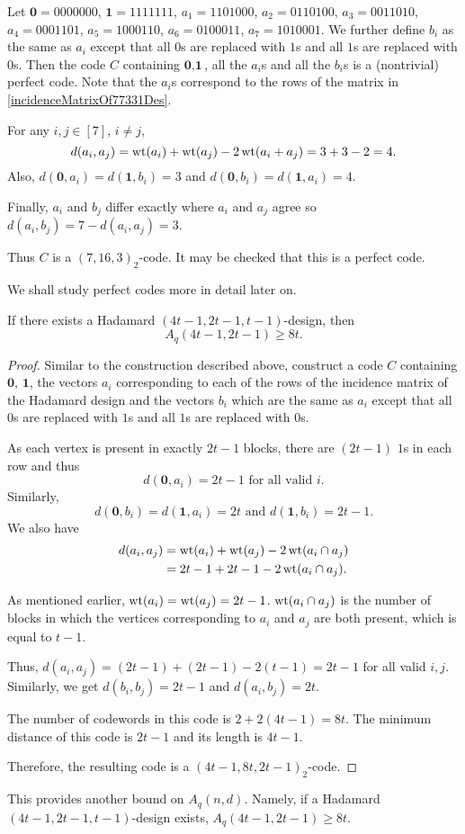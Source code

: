 Let $\textbf{0}=0000000$, $\textbf{1}=1111111$, $a_1=1101000$, $a_2=0110100$, $a_3=0011010$, $a_4=0001101$, $a_5=1000110$, $a_6=0100011$, $a_7=1010001$. We further define $b_i$ as the same as $a_i$ except that all $0$s are replaced with $1$s and all $1$s are replaced with $0$s. Then the code $C$ containing $\textbf{0}, \textbf{1}$, all the $a_i$s and all the $b_i$s is a (nontrivial) perfect code.
Note that the $a_i$s correspond to the rows of the matrix in \ref{incidenceMatrixOf77331Des}.

\vspace{2mm}
For any $i,j\in[7]$, $i\neq j$,
$$d(a_i,a_j)=\operatorname{wt}(a_i)+\operatorname{wt}(a_j)-2\operatorname{wt}(a_i+a_j)=3+3-2=4.$$
Also, $d(\textbf{0}, a_i)=d(\textbf{1}, b_i)=3$ and $d(\textbf{0}, b_i)=d(\textbf{1}, a_i)=4$.

Finally, $a_i$ and $b_j$ differ exactly where $a_i$ and $a_j$ agree so $d(a_i,b_j)=7-d(a_i,a_j)=3$.

Thus $C$ is a $(7,16,3)_2$-code. It may be checked that this is a perfect code.

\vspace{2mm}
We shall study perfect codes more in detail later on.

\begin{theorem}
    If there exists a Hadamard $(4t-1,2t-1,t-1)$-design, then
    $$A_q(4t-1,2t-1)\geq 8t.$$
\end{theorem}
\begin{proof}
    Similar to the construction described above, construct a code $C$ containing $\textbf{0}$, $\textbf{1}$, the vectors $a_i$ corresponding to each of the rows of the incidence matrix of the Hadamard design and the vectors $b_i$ which are the same as $a_i$ except that all $0$s are replaced with $1$s and all $1$s are replaced with $0$s.
    
    \vspace{1mm}
    As each vertex is present in exactly $2t-1$ blocks, there are $(2t-1)$ $1$s in each row and thus
    $$d(\textbf{0}, a_i)=2t-1 \text{ for all valid $i$.}$$
    Similarly,
    $$d(\textbf{0}, b_i)=d(\textbf{1}, a_i)=2t\text{ and } d(\textbf{1}, b_i)=2t-1.$$
    We also have 
    \begin{align*}
        d(a_i,a_j) &= \operatorname{wt}(a_i)+\operatorname{wt}(a_j)-2\operatorname{wt}(a_i\cap a_j) \\
                   &= 2t-1+2t-1-2\operatorname{wt}(a_i\cap a_j).    
    \end{align*}
    
    As mentioned earlier, $\operatorname{wt}(a_i)=\operatorname{wt}(a_j)=2t-1$. $\operatorname{wt}(a_i\cap a_j)$ is the number of blocks in which the vertices corresponding to $a_i$ and $a_j$ are both present, which is equal to $t-1$.
    
    Thus, $d(a_i, a_j)=(2t-1)+(2t-1)-2(t-1)=2t-1$ for all valid $i,j$. Similarly, we get $d(b_i,b_j)=2t-1$ and $d(a_i, b_j)=2t$.
    
    \vspace{1mm}
    The number of codewords in this code is $2+2(4t-1)=8t$. The minimum distance of this code is $2t-1$ and its length is $4t-1$.
    
    Therefore, the resulting code is a $(4t-1,8t,2t-1)_2$-code.
\end{proof}

This provides another bound on $A_q(n,d)$. Namely, if a Hadamard $(4t-1,2t-1,t-1)$-design exists, $A_q(4t-1,2t-1)\geq 8t$.

\clearpage